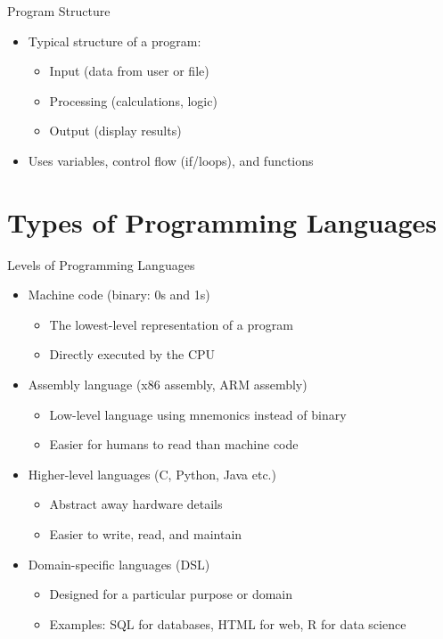 \documentclass[12pt, aspectratio=169]{beamer}
\begin{document}
    \begin{frame}{Program Structure}
        \begin{itemize}
            \item Typical structure of a program:
            \begin{itemize}
                \item Input (data from user or file)
                \item Processing (calculations, logic)
                \item Output (display results)
            \end{itemize}
            \item Uses variables, control flow (if/loops), and functions
        \end{itemize}
    \end{frame}


    \section{Types of Programming Languages}


    \begin{frame}{Levels of Programming Languages}
        \begin{itemize}
            \item Machine code (binary: 0s and 1s)
            \begin{itemize}
                \item The lowest-level representation of a program
                \item Directly executed by the CPU
            \end{itemize}
            
            \item Assembly language (x86 assembly, ARM assembly)
            \begin{itemize}
                \item Low-level language using mnemonics instead of binary
                \item Easier for humans to read than machine code
            \end{itemize}

            \item Higher-level languages (C, Python, Java etc.)
            \begin{itemize} 
                \item Abstract away hardware details
                \item Easier to write, read, and maintain
            \end{itemize}

            \item Domain-specific languages (DSL)
            \begin{itemize}
                \item Designed for a particular purpose or domain
                \item Examples: SQL for databases, HTML for web, R for data science
            \end{itemize}
        \end{itemize}
    \end{frame}
\end{document}

